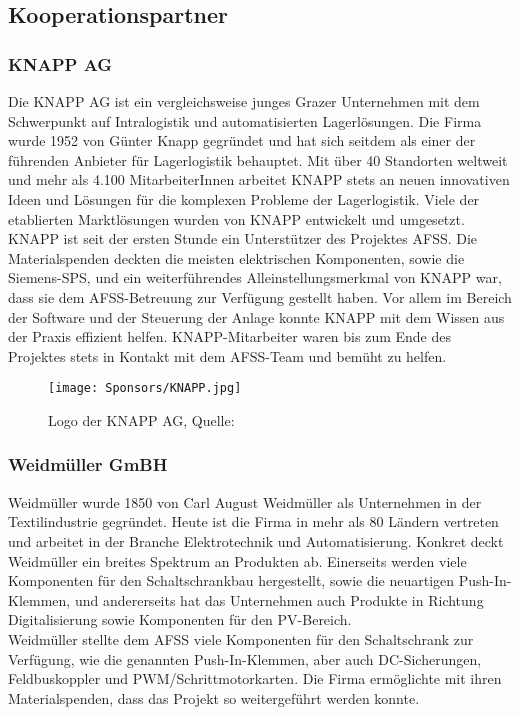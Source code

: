 \subsection{Kooperationspartner}

\subsubsection{KNAPP AG}
Die KNAPP AG ist ein vergleichsweise junges Grazer Unternehmen mit dem Schwerpunkt auf Intralogistik und automatisierten Lagerlösungen. Die Firma wurde 1952 von Günter Knapp gegründet und hat sich seitdem als einer der führenden Anbieter für Lagerlogistik behauptet. Mit über 40 Standorten weltweit und mehr als 4.100 MitarbeiterInnen arbeitet KNAPP stets an neuen innovativen Ideen und Lösungen für die komplexen Probleme der Lagerlogistik. Viele der etablierten Marktlösungen wurden von KNAPP entwickelt und umgesetzt. \cite{knapp}\\
KNAPP ist seit der ersten Stunde ein Unterstützer des Projektes AFSS. Die Materialspenden deckten die meisten elektrischen Komponenten, sowie die Siemens-SPS, und ein weiterführendes Alleinstellungsmerkmal von KNAPP war, dass sie dem AFSS-Betreuung zur Verfügung gestellt haben. Vor allem im Bereich der Software und der Steuerung der Anlage konnte KNAPP mit dem Wissen aus der Praxis effizient helfen. KNAPP-Mitarbeiter waren bis zum Ende des Projektes stets in Kontakt mit dem AFSS-Team und bemüht zu helfen.

\begin{figure}[H]
    \centering
    \texttt{[image: Sponsors/KNAPP.jpg]}
    \caption{Logo der KNAPP AG, Quelle: \cite{knapp_logo}}
    \label{fig:knapp_logo}
\end{figure}


\subsubsection{Weidmüller GmBH}

Weidmüller wurde 1850 von Carl August Weidmüller als Unternehmen in der Textilindustrie gegründet. Heute ist die Firma in mehr als 80 Ländern vertreten und arbeitet in der Branche Elektrotechnik und Automatisierung. Konkret deckt Weidmüller ein breites Spektrum an Produkten ab. Einerseits werden viele Komponenten für den Schaltschrankbau hergestellt, sowie die neuartigen Push-In-Klemmen, und andererseits hat das Unternehmen auch Produkte in Richtung Digitalisierung sowie Komponenten für den PV-Bereich. \cite{weidmueller}\\
Weidmüller stellte dem AFSS viele Komponenten für den Schaltschrank zur Verfügung, wie die genannten Push-In-Klemmen, aber auch DC-Sicherungen, Feldbuskoppler und PWM/Schrittmotorkarten. Die Firma ermöglichte mit ihren Materialspenden, dass das Projekt so weitergeführt werden konnte. 

